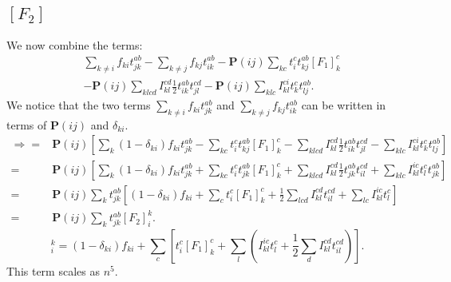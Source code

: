 \documentclass[graybox,sectrefs,envcountresetchap,open=right]{svmonodo}
\begin{document}
\subsection{$[F_2]$}
We now combine the terms:
\begin{align}
& \sum_{k \not= i} f_{ki} t_{jk}^{ab}
- \sum_{k \not= j} f_{kj} t_{ik}^{ab} 
- \mathbf{P}(ij) \sum_{kc} t_i^c t_{kj}^{ab} [F_1]_k^c
\nonumber \\ &
- \mathbf{P}(ij) \sum_{klcd} I_{kl}^{cd} \frac{1}{2} t_{ik}^{ab} t_{jl}^{cd}
- \mathbf{P}(ij) \sum_{klc} I_{kl}^{ci} t_k^c t_{lj}^{ab} .
\end{align}
We notice that the two terms $\sum_{k \not= i} f_{ki} t_{jk}^{ab}$ and $\sum_{k \not= j} f_{kj} t_{ik}^{ab}$ can be written in terms of $\mathbf{P}(ij)$ and $\delta_{ki}$.
\begin{align}
\Rightarrow = &
\mathbf{P}(ij) \left[
\sum_{k} (1 - \delta_{ki}) f_{ki} t_{jk}^{ab}
- \sum_{kc} t_i^c t_{kj}^{ab} [F_1]_k^c
- \sum_{klcd}  I_{kl}^{cd} \frac{1}{2} t_{ik}^{ab} t_{jl}^{cd}
- \sum_{klc} I_{kl}^{ci} t_k^c t_{lj}^{ab}
\right]
\nonumber \\
= &
\mathbf{P}(ij) \left[
\sum_{k} (1 - \delta_{ki}) f_{ki} t_{jk}^{ab}
+ \sum_{kc} t_i^c t_{jk}^{ab} [F_1]_k^c
+ \sum_{klcd}  I_{kl}^{cd} \frac{1}{2} t_{jk}^{ab} t_{il}^{cd}
+ \sum_{klc} I_{kl}^{ic} t_l^c t_{jk}^{ab}
\right]
\nonumber \\
= &
\mathbf{P}(ij) \sum_k t_{jk}^{ab} \left[
(1 - \delta_{ki}) f_{ki}
+ \sum_c t_i^c [F_1]_k^c
+ \frac{1}{2} \sum_{lcd} I_{kl}^{cd} t_{il}^{cd}
+ \sum_{lc} I_{kl}^{ic} t_l^c
\right]
\nonumber \\
= &
\mathbf{P}(ij) \sum_k t_{jk}^{ab} [F_2]_i^k .
\end{align}
\begin{equation}
[F_2]_i^k = (1 - \delta_{ki}) f_{ki}
+ \sum_c \left[t_i^c [F_1]_k^c
+ \sum_{l} \left( I_{kl}^{ic} t_l^c 
+ \frac{1}{2} \sum_{d} I_{kl}^{cd} t_{il}^{cd}
\right)
\right] .
\label{intermedF2}
\end{equation}
This term scales as $n^5$.
\end{document}

